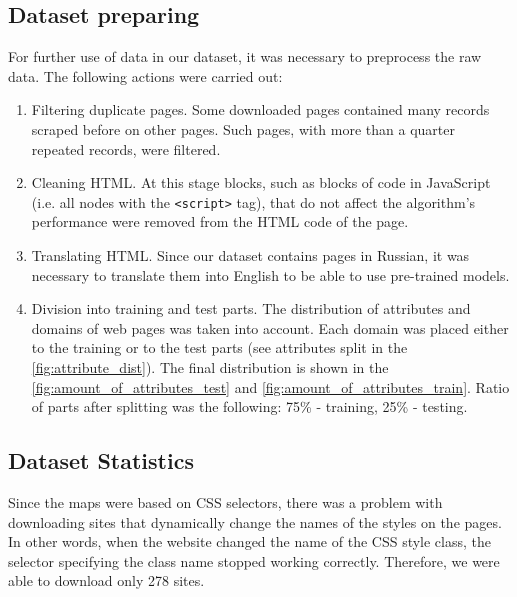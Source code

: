 \subsection{Dataset preparing}
For further use of data in our dataset, it was necessary to preprocess the raw data. The following actions were carried out:
\begin{enumerate}
    \item Filtering duplicate pages. Some downloaded pages contained many records scraped before on other pages. Such pages, with more than a quarter repeated records, were filtered.
    \item Cleaning HTML. At this stage blocks, such as blocks of code in JavaScript (i.e. all nodes with the \verb|<script>| tag), that do not affect the algorithm's performance were removed from the HTML code of the page.
    \item Translating HTML. Since our dataset contains pages in Russian, it was necessary to translate them into English to be able to use pre-trained models.
    \item Division into training and test parts. The distribution of attributes and domains of web pages was taken into account. Each domain was placed either to the training or to the test parts (see attributes split in the \autoref{fig:attribute_dist}). The final distribution is shown in the \autoref{fig:amount_of_attributes_test} and \autoref{fig:amount_of_attributes_train}. Ratio of parts after splitting was the following: 75\% - training, 25\% - testing.
\end{enumerate}

\subsection{Dataset Statistics}
Since the maps were based on CSS selectors, there was a problem with downloading sites that dynamically change the names of the styles on the pages. In other words, when the website changed the name of the CSS style class, the selector specifying the class name stopped working correctly. Therefore, we were able to download only 278 sites.


